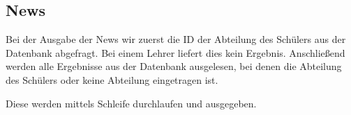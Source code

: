 \subsection{News}

Bei der Ausgabe der News wir zuerst die ID der Abteilung des Schülers aus der Datenbank abgefragt. Bei einem Lehrer liefert dies kein Ergebnis. Anschließend werden alle Ergebnisse aus der Datenbank ausgelesen, bei denen die Abteilung des Schülers oder keine Abteilung eingetragen ist.



Diese werden mittels Schleife durchlaufen und ausgegeben.